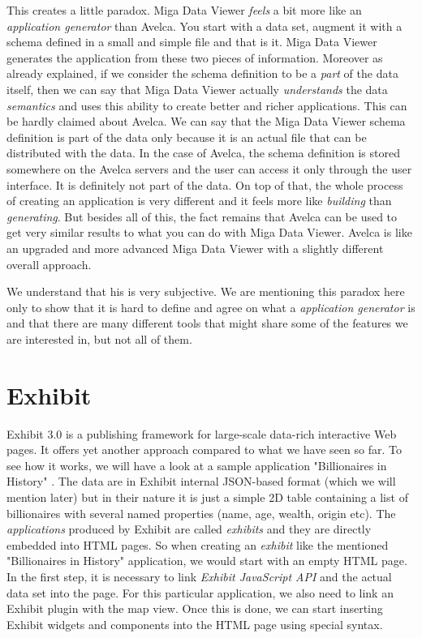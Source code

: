 This creates a little paradox. Miga Data Viewer \emph{feels} a bit more like an \emph{application generator} than Avelca. You start with a data set, augment it with a schema defined in a small and simple file and that is it. Miga Data Viewer generates the application from these two pieces of information. Moreover as already explained, if we consider the schema definition to be a \emph{part} of the data itself, then we can say that Miga Data Viewer actually \emph{understands} the data \emph{semantics} and uses this ability to create better and richer applications. This can be hardly claimed about Avelca. We can say that the Miga Data Viewer schema definition is part of the data only because it is an actual file that can be distributed with the data. In the case of Avelca, the schema definition is stored somewhere on the Avelca servers and the user can access it only through the user interface. It is definitely not part of the data. On top of that, the whole process of creating an application is very different and it feels more like \emph{building} than \emph{generating}. But besides all of this, the fact remains that Avelca can be used to get very similar results to what you can do with Miga Data Viewer. Avelca is like an upgraded and more advanced Miga Data Viewer with a slightly different overall approach.

We understand that his is very subjective. We are mentioning this paradox here only to show that it is hard to define and agree on what a \emph{application generator} is and that there are many different tools that might share some of the features we are interested in, but not all of them.

\section{Exhibit}

Exhibit 3.0 \cite{exhibit} is a publishing framework for large-scale data-rich interactive Web pages. It offers yet another approach compared to what we have seen so far. To see how it works, we will have a look at a sample application "Billionaires in History" \cite{exhibit_example}. The data are in Exhibit internal JSON-based format (which we will mention later) but in their nature it is just a simple 2D table containing a list of billionaires with several named properties (name, age, wealth, origin etc). The \emph{applications} produced by Exhibit are called \emph{exhibits} and they are directly embedded into HTML pages. So when creating an \emph{exhibit} like the mentioned "Billionaires in History" application, we would start with an empty HTML page. In the first step, it is necessary to link \emph{Exhibit JavaScript API} and the actual data set into the page. For this particular application, we also need to link an Exhibit plugin with the map view. Once this is done, we can start inserting Exhibit widgets and components into the HTML page using special syntax.

